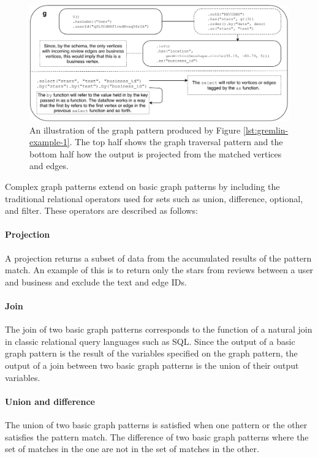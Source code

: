 \begin{figure}[h]
    \centering
    \includegraphics[width=16cm]{img/gremlin-pattern.pdf}
    \caption{An illustration of the graph pattern produced by Figure \ref{lst:gremlin-example-1}. The top half shows the graph traversal pattern and the bottom half how the output is projected from the matched vertices and edges.}
    \label{fig:gremlin-pattern}
\end{figure}

Complex graph patterns extend on basic graph patterns by including the traditional relational operators used for sets such as union, difference, optional, and filter. These operators are described as follows:

\paragraph{Projection} A projection returns a subset of data from the accumulated results of the pattern match. An example of this is to return only the stars from reviews between a user and business and exclude the text and edge IDs.

\paragraph{Join} The join of two basic graph patterns corresponds to the function of a natural join in classic relational query languages such as SQL. Since the output of a basic graph pattern is the result of the variables specified on the graph pattern, the output of a join between two basic graph patterns is the union of their output variables.

\paragraph{Union and difference} The union of two basic graph patterns is satisfied when one pattern or the other satisfies the pattern match. The difference of two basic graph patterns where the set of matches in the one are not in the set of matches in the other.

